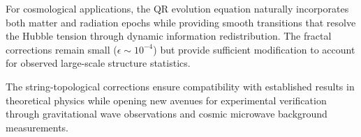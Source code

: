 For cosmological applications, the QR evolution equation naturally incorporates both matter and radiation epochs while providing smooth transitions that resolve the Hubble tension through dynamic information redistribution. The fractal corrections remain small ($\epsilon \sim 10^{-4}$) but provide sufficient modification to account for observed large-scale structure statistics.

The string-topological corrections ensure compatibility with established results in theoretical physics while opening new avenues for experimental verification through gravitational wave observations and cosmic microwave background measurements.